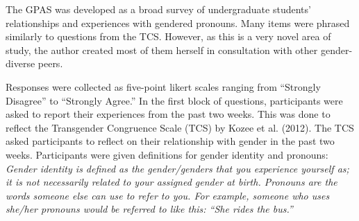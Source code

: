 \documentclass[12pt,twoside]{reedthesis}
\begin{document}
The GPAS was developed as a broad survey of undergraduate students' relationships and experiences with gendered pronouns. Many items were phrased similarly to questions from the TCS. However, as this is a very novel area of study, the author created most of them herself in consultation with other gender-diverse peers.

Responses were collected as five-point likert scales ranging from ``Strongly Disagree'' to ``Strongly Agree.'' In the first block of questions, participants were asked to report their experiences from the past two weeks. This was done to reflect the Transgender Congruence Scale (TCS) by Kozee et al. (2012). The TCS asked participants to reflect on their relationship with gender in the past two weeks. Participants were given definitions for gender identity and pronouns: \emph{Gender identity is defined as the gender/genders that you experience yourself as; it is not necessarily related to your assigned gender at birth. Pronouns are the words someone else can use to refer to you. For example, someone who uses she/her pronouns would be referred to like this: ``She rides the bus.''}
\end{document}
